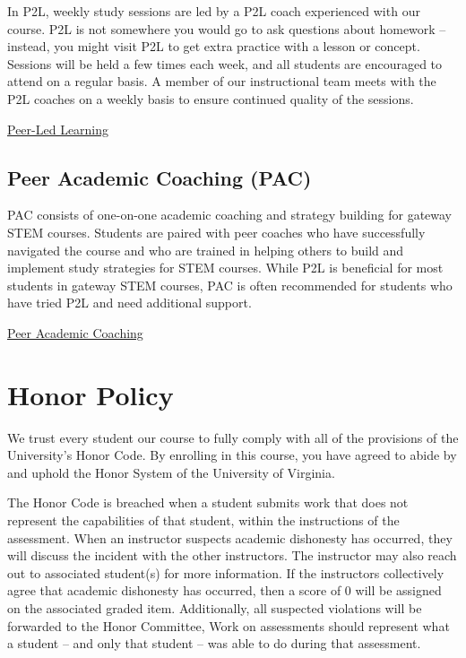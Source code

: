 \documentclass[12pt]{article}
\begin{document}
        In P2L, weekly study sessions are led by a P2L coach experienced with our course. P2L is not somewhere you would go to ask questions about homework – instead, you might visit P2L to get extra practice with a lesson or concept. Sessions will be held a few times each week, and all students are encouraged to attend on a regular basis. A member of our instructional team meets with the P2L coaches on a weekly basis to ensure continued quality of the sessions.

        \href{https://academicsupport.virginia.edu/p2l}{Peer-Led Learning}
        
        \subsection{Peer Academic Coaching (PAC)}
        
        PAC consists of one-on-one academic coaching and strategy building for gateway STEM courses. Students are paired with peer coaches who have successfully navigated the course and who are trained in helping others to build and implement study strategies for STEM courses. While P2L is beneficial for most students in gateway STEM courses, PAC is often recommended for students who have tried P2L and need additional support.

        \href{https://academicsupport.virginia.edu/pac}{Peer Academic Coaching}



    

    \section{Honor Policy}

    We trust every student our course to fully comply with all of the provisions of the University’s Honor Code. By enrolling in this course, you have agreed to abide by and uphold the Honor System of the University of Virginia.

    The Honor Code is breached when a student submits work that does not represent the capabilities of that student, within the instructions of the assessment. When an instructor suspects academic dishonesty has occurred, they will discuss the incident with the other instructors. The instructor may also reach out to associated student(s) for more information. If the instructors collectively agree that academic dishonesty has occurred, then a score of 0 will be assigned on the associated graded item. Additionally, all suspected violations will be forwarded to the Honor Committee, Work on assessments should represent what a student – and only that student – was able to do during that assessment. 
    
\end{document}
